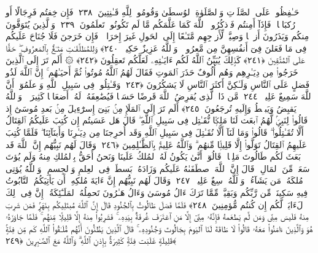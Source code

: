  حَـٰفِظُوا۟ عَلَى ٱلصَّلَوَٟتِ وَٱلصَّلَوٰةِ ٱلوُسطَىٰ وَقُومُوا۟ لِلَّهِ قَـٰنِتِينَ ﴿٢٣٨﴾
 فَإِن خِفتُم فَرِجَالًا أَو رُكبَانًۭا ۖ فَإِذَآ أَمِنتُم فَٱذكُرُوا۟ ٱللَّهَ كَمَا عَلَّمَكُم مَّا لَم تَكُونُوا۟ تَعلَمُونَ ﴿٢٣٩﴾
 وَٱلَّذِينَ يُتَوَفَّونَ مِنكُم وَيَذَرُونَ أَزوَٟجًۭا وَصِيَّةًۭ لِّأَزوَٟجِهِم مَّتَـٰعًا إِلَى ٱلحَولِ غَيرَ إِخرَاجٍۢ ۚ فَإِن خَرَجنَ فَلَا جُنَاحَ عَلَيكُم فِى مَا فَعَلنَ فِىٓ أَنفُسِهِنَّ مِن مَّعرُوفٍۢ ۗ وَٱللَّهُ عَزِيزٌ حَكِيمٌۭ ﴿٢٤٠﴾
 وَلِلمُطَلَّقَـٰتِ مَتَـٰعٌۢ بِٱلمَعرُوفِ ۖ حَقًّا عَلَى ٱلمُتَّقِينَ ﴿٢٤١﴾
 كَذَٟلِكَ يُبَيِّنُ ٱللَّهُ لَكُم ءَايَـٰتِهِۦ لَعَلَّكُم تَعقِلُونَ ﴿٢٤٢﴾
 ۞ أَلَم تَرَ إِلَى ٱلَّذِينَ خَرَجُوا۟ مِن دِيَـٰرِهِم وَهُم أُلُوفٌ حَذَرَ ٱلمَوتِ فَقَالَ لَهُمُ ٱللَّهُ مُوتُوا۟ ثُمَّ أَحيَـٰهُم ۚ إِنَّ ٱللَّهَ لَذُو فَضلٍ عَلَى ٱلنَّاسِ وَلَـٰكِنَّ أَكثَرَ ٱلنَّاسِ لَا يَشكُرُونَ ﴿٢٤٣﴾
 وَقَـٰتِلُوا۟ فِى سَبِيلِ ٱللَّهِ وَٱعلَمُوٓا۟ أَنَّ ٱللَّهَ سَمِيعٌ عَلِيمٌۭ ﴿٢٤٤﴾
 مَّن ذَا ٱلَّذِى يُقرِضُ ٱللَّهَ قَرضًا حَسَنًۭا فَيُضَٰعِفَهُۥ لَهُۥٓ أَضعَافًۭا كَثِيرَةًۭ ۚ وَٱللَّهُ يَقبِضُ وَيَبصُۜطُ وَإِلَيهِ تُرجَعُونَ ﴿٢٤٥﴾
 أَلَم تَرَ إِلَى ٱلمَلَإِ مِنۢ بَنِىٓ إِسرَٰٓءِيلَ مِنۢ بَعدِ مُوسَىٰٓ إِذ قَالُوا۟ لِنَبِىٍّۢ لَّهُمُ ٱبعَث لَنَا مَلِكًۭا نُّقَـٰتِل فِى سَبِيلِ ٱللَّهِ ۖ قَالَ هَل عَسَيتُم إِن كُتِبَ عَلَيكُمُ ٱلقِتَالُ أَلَّا تُقَـٰتِلُوا۟ ۖ قَالُوا۟ وَمَا لَنَآ أَلَّا نُقَـٰتِلَ فِى سَبِيلِ ٱللَّهِ وَقَد أُخرِجنَا مِن دِيَـٰرِنَا وَأَبنَآئِنَا ۖ فَلَمَّا كُتِبَ عَلَيهِمُ ٱلقِتَالُ تَوَلَّوا۟ إِلَّا قَلِيلًۭا مِّنهُم ۗ وَٱللَّهُ عَلِيمٌۢ بِٱلظَّـٰلِمِينَ ﴿٢٤٦﴾
 وَقَالَ لَهُم نَبِيُّهُم إِنَّ ٱللَّهَ قَد بَعَثَ لَكُم طَالُوتَ مَلِكًۭا ۚ قَالُوٓا۟ أَنَّىٰ يَكُونُ لَهُ ٱلمُلكُ عَلَينَا وَنَحنُ أَحَقُّ بِٱلمُلكِ مِنهُ وَلَم يُؤتَ سَعَةًۭ مِّنَ ٱلمَالِ ۚ قَالَ إِنَّ ٱللَّهَ ٱصطَفَىٰهُ عَلَيكُم وَزَادَهُۥ بَسطَةًۭ فِى ٱلعِلمِ وَٱلجِسمِ ۖ وَٱللَّهُ يُؤتِى مُلكَهُۥ مَن يَشَآءُ ۚ وَٱللَّهُ وَٟسِعٌ عَلِيمٌۭ ﴿٢٤٧﴾
 وَقَالَ لَهُم نَبِيُّهُم إِنَّ ءَايَةَ مُلكِهِۦٓ أَن يَأتِيَكُمُ ٱلتَّابُوتُ فِيهِ سَكِينَةٌۭ مِّن رَّبِّكُم وَبَقِيَّةٌۭ مِّمَّا تَرَكَ ءَالُ مُوسَىٰ وَءَالُ هَـٰرُونَ تَحمِلُهُ ٱلمَلَـٰٓئِكَةُ ۚ إِنَّ فِى ذَٟلِكَ لَءَايَةًۭ لَّكُم إِن كُنتُم مُّؤمِنِينَ ﴿٢٤٨﴾
 فَلَمَّا فَصَلَ طَالُوتُ بِٱلجُنُودِ قَالَ إِنَّ ٱللَّهَ مُبتَلِيكُم بِنَهَرٍۢ فَمَن شَرِبَ مِنهُ فَلَيسَ مِنِّى وَمَن لَّم يَطعَمهُ فَإِنَّهُۥ مِنِّىٓ إِلَّا مَنِ ٱغتَرَفَ غُرفَةًۢ بِيَدِهِۦ ۚ فَشَرِبُوا۟ مِنهُ إِلَّا قَلِيلًۭا مِّنهُم ۚ فَلَمَّا جَاوَزَهُۥ هُوَ وَٱلَّذِينَ ءَامَنُوا۟ مَعَهُۥ قَالُوا۟ لَا طَاقَةَ لَنَا ٱليَومَ بِجَالُوتَ وَجُنُودِهِۦ ۚ قَالَ ٱلَّذِينَ يَظُنُّونَ أَنَّهُم مُّلَـٰقُوا۟ ٱللَّهِ كَم مِّن فِئَةٍۢ قَلِيلَةٍ غَلَبَت فِئَةًۭ كَثِيرَةًۢ بِإِذنِ ٱللَّهِ ۗ وَٱللَّهُ مَعَ ٱلصَّـٰبِرِينَ ﴿٢٤٩﴾
